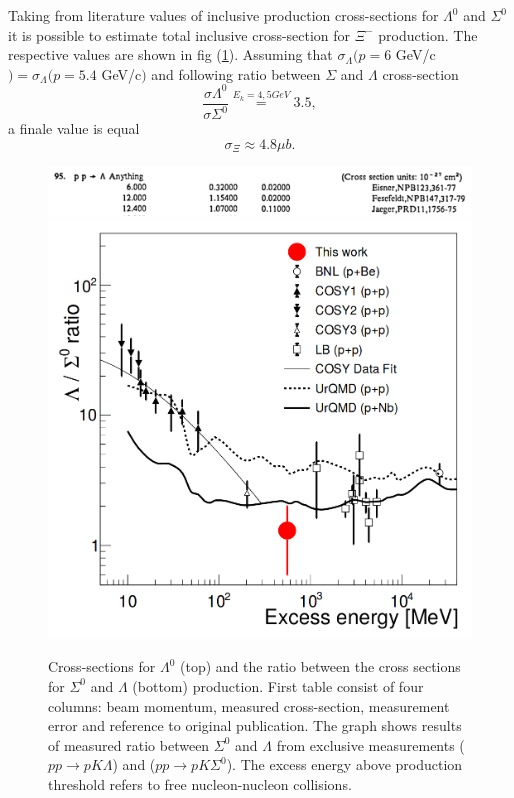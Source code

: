 \documentclass[12pt]{article}
\begin{document}
Taking from literature values of inclusive production cross-sections for $\Lambda^0$ and $\Sigma^0$ it is possible to estimate total inclusive cross-section for $\Xi^-$ production. The respective values are shown in fig (\ref{fig:crosssection}). Assuming that $\sigma_\Lambda (p=6$ GeV/c$)=\sigma_\Lambda (p=5.4$ GeV/c$)$ and following ratio between $\Sigma$ and $\Lambda$ cross-section
\begin{equation}
\frac{\sigma \Lambda^0}{\sigma \Sigma^0}\stackrel{E_k=4,5GeV}{=}3.5,
\end{equation}
a finale value is equal 
\begin{equation}
  \sigma_\Xi \approx 4.8 \mu b.
\end{equation}


\begin{figure}[]
  \centering
  \includegraphics[width=0.8 \textwidth] {../Images/Lambda}
  \quad
  \includegraphics[width=0.5 \textwidth] {../Images/XiDoLambda}
  \caption{Cross-sections for $\Lambda^0$ (top) \cite{Bornstein} and the ratio between the cross sections for $\Sigma^0$ and $\Lambda$ (bottom) \cite{Sigma3.5} production. First table consist of four columns: beam momentum, measured cross-section, measurement error and reference to original publication. The graph shows results of measured ratio between $\Sigma^0$ and $\Lambda$ from exclusive measurements ($pp \rightarrow pK \Lambda$) and ($pp \rightarrow pK \Sigma^0$). The excess energy above production threshold refers to free nucleon-nucleon collisions.}
  \label{fig:crosssection}
\end{figure}
\end{document}
